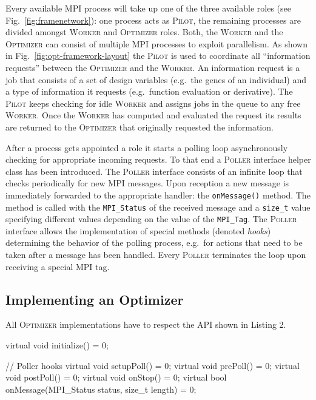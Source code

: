 \documentclass[%
reprint,
amsmath,amssymb,
aps,
prstab,
]{revtex4-1}
\begin{document}
Every available MPI process will take up one of the three available roles (see
  Fig.~\ref{fig:framenetwork}):  one process acts as \textsc{Pilot}, the
  remaining processes are divided amongst \textsc{Worker} and
  \textsc{Optimizer} roles.
Both, the \textsc{Worker} and the \textsc{Optimizer} can consist of multiple
  MPI processes to exploit parallelism.
As shown in Fig.~\ref{fig:opt-framework-layout} the \textsc{Pilot} is used
  to coordinate all ``information requests'' between the \textsc{Optimizer}
  and the \textsc{Worker}.
An information request is a job that consists of a set of design variables
  (e.g.~the genes of an individual) and a type of information it requests
  (e.g.~function evaluation or derivative).
The \textsc{Pilot} keeps checking for idle \textsc{Worker} and assigns jobs
  in the queue to any free \textsc{Worker}.
Once the \textsc{Worker} has computed and evaluated the request its results
  are returned to the \textsc{Optimizer} that originally requested the
  information.

After a process gets appointed a role it starts a polling loop asynchronously
  checking for appropriate incoming requests.
To that end a \textsc{Poller} interface helper class has been introduced.
The \textsc{Poller} interface consists of an infinite loop that checks
  periodically for new MPI messages.
Upon reception a new message is immediately forwarded to the appropriate
  handler: the \texttt{onMessage()} method.
The method is called with the \texttt{MPI\_Status} of the received message and
  a \texttt{size\_t} value specifying different values depending on the value
  of the \texttt{MPI\_Tag}.
The \textsc{Poller} interface allows the implementation of special methods
  (denoted \textit{hooks}) determining the behavior of the polling process,
  e.g.\ for actions that need to be taken after a message has been handled.
Every \textsc{Poller} terminates the loop upon receiving a special MPI tag.


\subsection{Implementing an Optimizer}

All \textsc{Optimizer} implementations have to respect the API shown in
Listing 2.

\begin{code}
virtual void initialize() = 0;

// Poller hooks
virtual void setupPoll() = 0;
virtual void prePoll() = 0;
virtual void postPoll() = 0;
virtual void onStop() = 0;
virtual bool onMessage(MPI_Status status,
                       size_t length) = 0;
\end{code}
\end{document}
